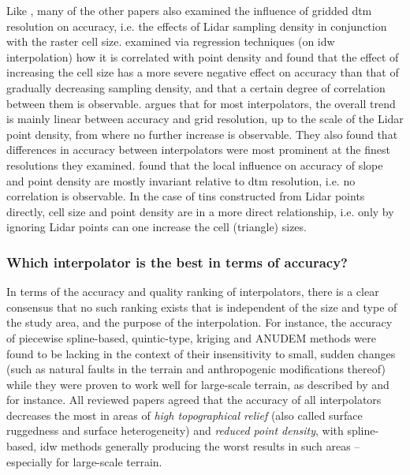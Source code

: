 Like \cite{aguilar_etal_2010}, many of the other papers also examined the influence of gridded \ac{dtm} resolution on accuracy, i.e. the effects of Lidar sampling density in conjunction with the raster cell size. \cite{chow_hodgson_2009} examined via regression techniques (on \ac{idw} interpolation) how it is correlated with point density and found that the effect of increasing the cell size has a more severe negative effect on accuracy than that of gradually decreasing sampling density, and that a certain degree of correlation between them is observable. \cite{guo_etal_2010} argues that for most interpolators, the overall trend is mainly linear between accuracy and grid resolution, up to the scale of the Lidar point density, from where no further increase is observable. They also found that differences in accuracy between interpolators were most prominent at the finest resolutions they examined. \cite{bater_coops_2009} found that the local influence on accuracy of slope and point density are mostly invariant relative to \ac{dtm} resolution, i.e. no correlation is observable. In the case of \ac{tin}s constructed from Lidar points directly, cell size and point density are in a more direct relationship, i.e. only by ignoring Lidar points can one increase the cell (triangle) sizes.

\subsubsection{Which interpolator is the best in terms of accuracy?}

In terms of the accuracy and quality ranking of interpolators, there is a clear consensus that no such ranking exists that is independent of the size and type of the study area, and the purpose of the interpolation. For instance, the accuracy of piecewise spline-based, quintic-type, kriging and ANUDEM methods were found to be lacking in the context of their insensitivity to small, sudden changes (such as natural faults in the terrain and anthropogenic modifications thereof) while they were proven to work well for large-scale terrain, as described by \cite{bater_coops_2009} and \cite{guo_etal_2010} for instance. All reviewed papers agreed that the accuracy of all interpolators decreases the most in areas of \textit{high topographical relief} (also called surface ruggedness and surface heterogeneity) and \textit{reduced point density}, with spline-based, \ac{idw} methods generally producing the worst results in such areas – especially for large-scale terrain.

